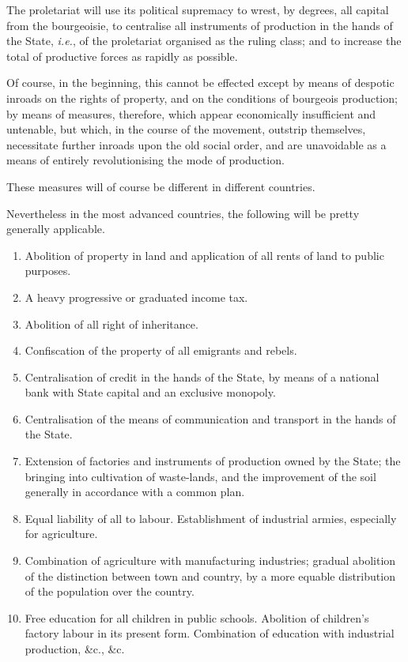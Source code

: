 The proletariat will use its political supremacy to wrest, by degrees,
all capital from the bourgeoisie, to centralise all instruments of
production in the hands of the State, \textit{i.e.}, of the proletariat
organised as the ruling class; and to increase the total of productive
forces as rapidly as possible.

Of course, in the beginning, this cannot be effected except by means of
despotic inroads on the rights of property, and on the conditions of
bourgeois production; by means of measures, therefore, which appear
economically insufficient and untenable, but which, in the course of
the movement, outstrip themselves, necessitate further inroads upon the
old social order, and are unavoidable as a means of entirely
revolutionising the mode of production.

These measures will of course be different in different countries.

Nevertheless in the most advanced countries, the following will be
pretty generally applicable.

\begin{enumerate}
\item Abolition of property in land and application of all rents of land
to public purposes.

\item A heavy progressive or graduated income tax.

\item Abolition of all right of inheritance.

\item Confiscation of the property of all emigrants and rebels.

\item Centralisation of credit in the hands of the State, by means of a
national bank with State capital and an exclusive monopoly.

\item Centralisation of the means of communication and transport in the
hands of the State.

\item Extension of factories and instruments of production owned by the
State; the bringing into cultivation of waste-lands, and the
improvement of the soil generally in accordance with a common plan.

\item Equal liability of all to labour. Establishment of industrial
armies, especially for agriculture.

\item Combination of agriculture with manufacturing industries; gradual
abolition of the distinction between town and country, by a more
equable distribution of the population over the country.

\item Free education for all children in public schools.     Abolition of
children’s factory labour in its present form.     Combination of
education with industrial production, \&c., \&c.
\end{enumerate}

